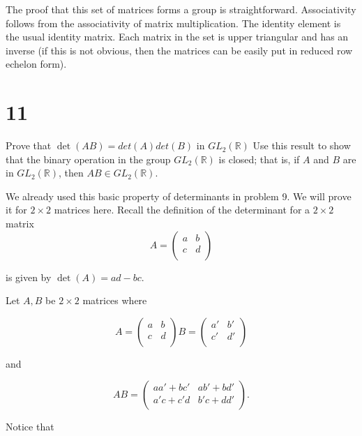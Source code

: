 \documentclass[a4paper]{article}
\begin{document}
The proof that this set of matrices forms a group is straightforward. Associativity follows from the associativity of matrix multiplication. The identity element is the usual identity matrix. Each matrix in the set is upper triangular and has an inverse (if this is not obvious, then the matrices can be easily put in reduced row echelon form).


\section*{11}

Prove that $\det(AB) = det(A)det(B)$ in $GL_2(\mathbb{R})$ Use this result to show that the binary operation in the group $GL_2(\mathbb{R})$ is closed; that is, if $A$ and $B$ are in $GL_2(\mathbb{R})$, then $AB \in GL_2(\mathbb{R})$.

\vspace{\baselineskip}

We already used this basic property of determinants in problem 9. We will prove it for $2 \times 2$ matrices here. Recall the definition of the determinant for a $2 \times 2$ matrix 
$$A = 
  \begin{pmatrix}
    a & b \\
    c & d \\
  \end{pmatrix}
$$
  
is given by $\det(A) = ad - bc$.

\vspace{\baselineskip}

Let $A,B$ be $2 \times 2$ matrices where  

$$A = 
  \begin{pmatrix}
    a & b \\
    c & d \\
  \end{pmatrix}
  B = 
  \begin{pmatrix}
    a' & b' \\
    c' & d' \\
  \end{pmatrix}
$$

and 

$$AB = 
  \begin{pmatrix}
    aa' + bc' & ab' + bd'\\
    a'c + c'd & b'c + dd' \\
  \end{pmatrix}.
$$

Notice that 
\end{document}
